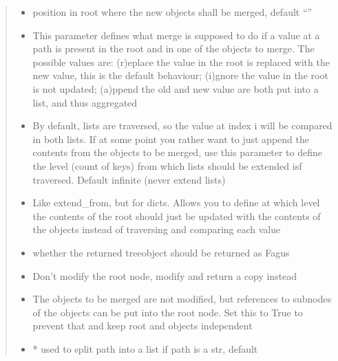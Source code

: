 \documentclass[a4paper,10pt,english]{sphinxmanual}
\begin{document}
\begin{fulllineitems}
\begin{fulllineitems}
\begin{quote}
\begin{description}
\begin{itemize}
\item {}
\sphinxAtStartPar
{} \textendash{} position in root where the new objects shall be merged, default “”

\item {}
\sphinxAtStartPar
{} \textendash{} This parameter defines what merge is supposed to do if a value at a path is present in the
root and in one of the objects to merge. The possible values are: (r)eplace \sphinxhyphen{} the value in the root is
replaced with the new value, this is the default behaviour; (i)gnore \sphinxhyphen{} the value in the root is not
updated; (a)ppend \sphinxhyphen{} the old and new value are both put into a list, and thus aggregated

\item {}
\sphinxAtStartPar
{} \textendash{} By default, lists are traversed, so the value at index i will be compared in both lists. If
at some point you rather want to just append the contents from the objects to be merged, use this
parameter to define the level (count of keys) from which lists should be extended isf traversed. Default
infinite (never extend lists)

\item {}
\sphinxAtStartPar
{} \textendash{} Like extend\_from, but for dicts. Allows you to define at which level the contents of the root
should just be updated with the contents of the objects instead of traversing and comparing each value

\item {}
\sphinxAtStartPar
{} \textendash{} whether the returned tree\sphinxhyphen{}object should be returned as Fagus

\item {}
\sphinxAtStartPar
{} \textendash{} Don’t modify the root node, modify and return a copy instead

\item {}
\sphinxAtStartPar
{} \textendash{} The objects to be merged are not modified, but references to subnodes of the objects can be
put into the root node. Set this to True to prevent that and keep root and objects independent

\item {}
\sphinxAtStartPar
{} \textendash{} * used to split path into a list if path is a str, default 


\end{itemize}
\end{description}
\end{quote}
\end{fulllineitems}
\end{fulllineitems}
\end{document}
